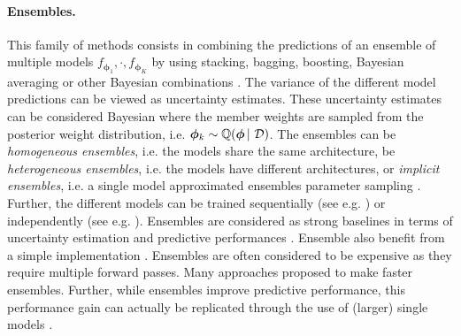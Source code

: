 \paragraph*{Ensembles.} This family of methods consists in combining the predictions of an ensemble of multiple models $f_{\bm{\phi}_1},\cdot, f_{\bm{\phi}_K}$ by using stacking, bagging, boosting, Bayesian averaging or other Bayesian combinations \citep{bayesian-averaging-to-combination}. The variance of the different model predictions can be viewed as uncertainty estimates. These uncertainty estimates can be considered Bayesian where the member weights are sampled from the posterior weight distribution, i.e. $\bm{\phi}_k \sim \operatorname{\mathbb{Q}}(\bm{\phi} \,|\, \operatorname{\mathcal{D}})$. The ensembles can be \emph{homogeneous ensembles}, i.e. the models share the same architecture, be \emph{heterogeneous ensembles}, i.e. the models have different architectures, or \emph{implicit ensembles}, i.e. a single model approximated ensembles parameter sampling \citep{abe2022deep}. Further, the different models can be trained sequentially (see e.g. \citep{schapire2013explaining, chenG16xgboost}) or independently (see e.g. \citep{ensembles}).
%
Ensembles are considered as strong baselines in terms of uncertainty estimation and predictive performances \citep{dataset-shift}. Ensemble also benefit from a simple implementation \citep{ensembles}.
%
Ensembles are often considered to be expensive as they require multiple forward passes. Many approaches \citep{batch-ensembles,mimo-independent-subnetworks} proposed to make faster ensembles. Further, while ensembles improve predictive performance, this performance gain can actually be replicated through the use of (larger) single models \citep{abe2022deep}.

